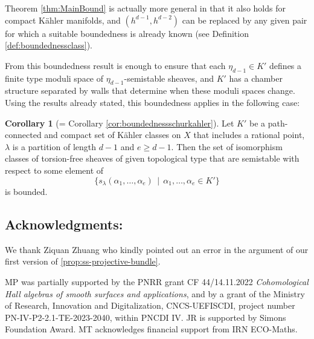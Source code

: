 \documentclass[a4,reqno]{amsart}
\theoremstyle{definition}
\newtheorem{corollary}[theorem]{Corollary}
\numberwithin{equation}{section}
\begin{document}
Theorem \ref{thm:MainBound} is actually more general in that it also holds for compact K\"ahler manifolds, and $(h^{d-1},h^{d-2})$ can be 
replaced by any given pair for which  a suitable boundedness is already known (see Definition \ref{def:boundednessclass}).


From \cite{MegyPavelToma} this boundedness result is enough to ensure that each $\eta_{d-1} \in K'$ defines a finite type moduli space of $\eta_{d-1}$-semistable sheaves, and $K'$ has a chamber structure separated by walls that determine when these moduli spaces change.   Using the results already stated, this boundedness applies in the following case:

\begin{corollary}[= Corollary \ref{cor:boundednessschurkahler}]
Let $K'$ be a path-connected  and compact set of K\"ahler classes on $X$ that includes a rational point, $\lambda$ is a partition of length $d-1$ and $e\ge d-1$. Then the set of isomorphism classes of torsion-free sheaves of given topological type that are semistable with respect to some element of 
$$  \{ s_{\lambda}(\alpha_1,\ldots,\alpha_e) \, \mid \, \alpha_1,\ldots,\alpha_e\in K'\}$$
is bounded.
\end{corollary}

\subsection*{Acknowledgments: } We thank Ziquan Zhuang who kindly pointed out an error in the argument of our first version of \cref{prop:ss-projective-bundle}.  

MP was partially supported by the PNRR grant CF 44/14.11.2022 \textit{Cohomological Hall algebras of smooth surfaces and applications}, and by a grant of the Ministry of Research, Innovation and Digitalization, CNCS-UEFISCDI, project number PN-IV-P2-2.1-TE-2023-2040, within PNCDI IV.  JR is supported by Simons Foundation Award.  MT acknowledges financial support from  IRN ECO-Maths. 
\end{document}
